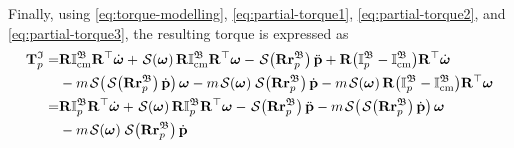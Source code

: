 Finally, using \eqref{eq:torque-modelling}, \eqref{eq:partial-torque1}, \eqref{eq:partial-torque2}, and \eqref{eq:partial-torque3}, the resulting torque is expressed as
\begin{align}
    \mathbf{T}^\mathfrak{I}_p = &\mathbf{R}\mathbb{I}^\mathfrak{B}_\text{cm}\mathbf{R}^\top\dot{\boldsymbol{\omega}} + \SL[\boldsymbol{\omega}]\mathbf{R}\mathbb{I}^\mathfrak{B}_\text{cm}\mathbf{R}^\top\boldsymbol{\omega} - \SL[\mathbf{R}\mathbf{r}^\mathfrak{B}_p]\ddot{\mathbf{p}} + \mathbf{R}\bigl(\mathbb{I}^\mathfrak{B}_p - \mathbb{I}^\mathfrak{B}_\text{cm}\bigr)\mathbf{R}^\top\dot{\boldsymbol{\omega}} \\
    &-m\SL[\SL[\mathbf{R}\mathbf{r}_p^\mathfrak{B}]\dot{\mathbf{p}}]\boldsymbol{\omega}
    -m\SL[\boldsymbol{\omega}]\SL[\mathbf{R}\mathbf{r}_p^\mathfrak{B}]\dot{\mathbf{p}}
    - m\SL[\boldsymbol{\omega}]\mathbf{R}\bigl(\mathbb{I}^\mathfrak{B}_p-\mathbb{I}^\mathfrak{B}_\text{cm}\bigr)\mathbf{R}^\top\boldsymbol{\omega}\\
    = &\mathbf{R}\mathbb{I}^\mathfrak{B}_p\mathbf{R}^\top\dot{\boldsymbol{\omega}} + \SL[\boldsymbol{\omega}]\mathbf{R}\mathbb{I}^\mathfrak{B}_p\mathbf{R}^\top\boldsymbol{\omega} - \SL[\mathbf{R}\mathbf{r}^\mathfrak{B}_p]\ddot{\mathbf{p}} -m\SL[\SL[\mathbf{R}\mathbf{r}_p^\mathfrak{B}]\dot{\mathbf{p}}]\boldsymbol{\omega}\\
    &-m\SL[\boldsymbol{\omega}]\SL[\mathbf{R}\mathbf{r}_p^\mathfrak{B}]\dot{\mathbf{p}}
\end{align}

